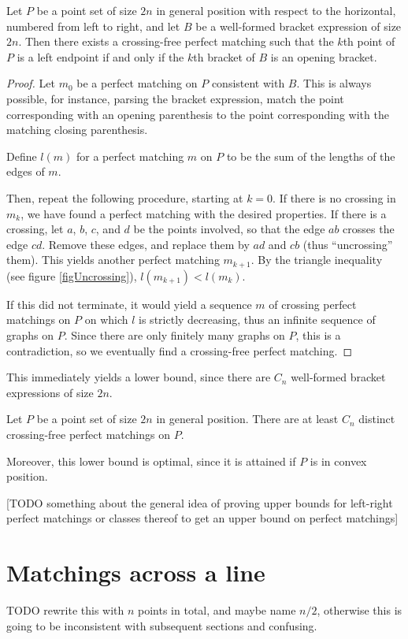 \documentclass[10pt, a4paper, twoside]{basestyle}
\begin{document}
\begin{theorem}
Let $P$ be a point set of size $2n$ in general position with respect to the horizontal,
numbered from left to right, and let $B$ be a well-formed bracket expression of size $2n$.
Then there exists a crossing-free perfect matching such that the $k$th point of $P$ is a left
endpoint if and only if the $k$th bracket of $B$ is an opening bracket.
\begin{proof}
Let $m_0$ be a perfect matching on $P$ consistent with $B$. This is always possible, for instance,
parsing the bracket expression, match the point corresponding with an opening parenthesis
to the point corresponding with the matching closing parenthesis.

Define $l(m)$ for a perfect matching $m$ on $P$ to be the sum of the lengths of the edges of $m$.

Then, repeat the following procedure, starting at $k=0$.
If there is no crossing in $m_k$, we have found a perfect matching with the desired properties.
If there is a crossing, let $a$, $b$, $c$, and $d$ be the points involved, so that the edge
$ab$ crosses the edge $cd$. Remove these edges, and replace them by $ad$ and $cb$
(thus ``uncrossing'' them). This yields another perfect matching $m_{k+1}$. By the triangle
inequality (see figure \ref{figUncrossing}), $l(m_{k+1})<l(m_k)$.

If this did not terminate, it would yield a sequence $m$ of crossing perfect matchings on $P$ on
which $l$ is strictly decreasing, thus an infinite sequence of graphs on $P$.
Since there are only finitely many graphs on $P$, this is a contradiction, so we eventually find a
crossing-free perfect matching.
\end{proof}
\end{theorem}
This immediately yields a lower bound, since there are $C_n$ well-formed bracket expressions
of size $2n$.
\begin{corollary}
Let $P$ be a point set of size $2n$ in general position. There are at least $C_n$ distinct
crossing-free perfect matchings on $P$.
\end{corollary}
Moreover, this lower bound is optimal, since it is attained if $P$ is in convex position.

[TODO something about the general idea of proving upper bounds for left-right perfect matchings or
classes thereof to get an upper bound on perfect matchings]

\section{Matchings across a line}
TODO rewrite this with $n$ points in total, and maybe name $n/2$, otherwise this is going to be inconsistent
with subsequent sections and confusing.
\end{document}
